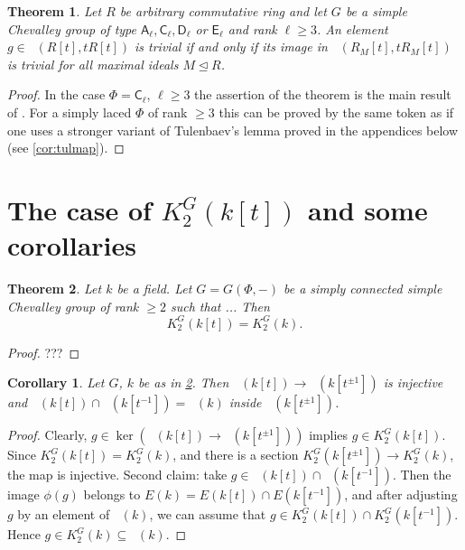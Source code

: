 \documentclass[oneside,12pt]{amsart}
\newtheorem{thm}{Theorem}
\numberwithin{equation}{section}
\numberwithin{lem}{section}
\newtheorem{cor}[lem]{Corollary}
\theoremstyle{definition}
\theoremstyle{remark}
\DeclareMathOperator{\St}{St^G}
\newcommand{\rA}{\mathsf{A}}
\newcommand{\rC}{\mathsf{C}}
\newcommand{\rD}{\mathsf{D}}
\newcommand{\rE}{\mathsf{E}}
\begin{document}
\begin{thm}\label{thm:lg-k2}
Let $R$ be arbitrary commutative ring and let $G$ be a simple Chevalley group of type $\rA_\ell, \rC_\ell, \rD_\ell$ or $\rE_\ell$ and rank $\ell \geq 3$.
An element $g \in \St(R[t], tR[t])$ is trivial if and only if
its image in $\St(R_M[t], tR_M[t])$ is trivial for all maximal ideals $M \trianglelefteq R$.
\end{thm}
\begin{proof}
In the case $\Phi=\rC_\ell$, $\ell\geq 3$ the assertion of the theorem is the main result of \cite{La15}.
For a simply laced $\Phi$ of rank $\geq 3$ this can be proved by the same token as \cite[Theorem~2]{S15} if one uses a stronger variant of Tulenbaev's lemma
proved in the appendices below (see \cref{cor:tulmap}).
\end{proof}

\section{The case of $K_2^G(k[t])$ and some corollaries}

\begin{thm}\label{thm:k[t]}
Let $k$ be a field.
Let $G=G(\Phi,-)$ be a simply connected simple Chevalley group of rank $\ge 2$ such that ...
Then $$K_2^G(k[t])=K_2^G(k).$$
\end{thm}
\begin{proof}
???
\end{proof}

\begin{cor}\label{cor:k[t]inj}
Let $G$, $k$ be as in \cref{thm:k[t]}. Then $\St(k[t])\to\St(k[t^{\pm 1}])$ is injective and $\St(k[t])\cap\St(k[t^{-1}])=\St(k)$ inside
$\St(k[t^{\pm 1}])$.
\end{cor}
\begin{proof}
Clearly, $g\in\ker(\St(k[t])\to\St(k[t^{\pm 1}]))$ implies $g\in K_2^G(k[t])$. Since $K_2^G(k[t])=K_2^G(k)$,
and  there is a section $K_2^G(k[t^{\pm 1}])\to K_2^G(k)$, the map is injective.
Second claim: take $g\in \St(k[t])\cap\St(k[t^{-1}])$.
Then the image $\phi(g)$ belongs to $E(k)=E(k[t])\cap E(k[t^{-1}])$, and
after adjusting $g$ by an element of $\St(k)$, we can assume that $g\in K_2^G(k[t])\cap K_2^G(k[t^{-1}])$. Hence
$g\in K_2^G(k)\subseteq\St(k)$.
\end{proof}
\end{document}
